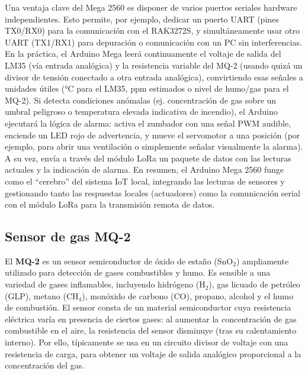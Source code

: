 Una ventaja clave del Mega 2560 es disponer de varios puertos seriales hardware independientes. Esto permite, por ejemplo, dedicar un puerto UART (pines TX0/RX0) para la comunicación con el RAK3272S, y simultáneamente usar otro UART (TX1/RX1) para depuración o comunicación con un PC sin interferencias. En la práctica, el Arduino Mega leerá continuamente el voltaje de salida del LM35 (vía entrada analógica) y la resistencia variable del MQ-2 (usando quizá un divisor de tensión conectado a otra entrada analógica), convirtiendo esas señales a unidades útiles (°C para el LM35, ppm estimados o nivel de humo/gas para el MQ-2). Si detecta condiciones anómalas (ej. concentración de gas sobre un umbral peligroso o temperatura elevada indicativa de incendio), el Arduino ejecutará la lógica de alarma: activa el zumbador con una señal PWM audible, enciende un LED rojo de advertencia, y mueve el servomotor a una posición (por ejemplo, para abrir una ventilación o simplemente señalar visualmente la alarma). A su vez, envía a través del módulo LoRa un paquete de datos con las lecturas actuales y la indicación de alarma. En resumen, el Arduino Mega 2560 funge como el “cerebro” del sistema IoT local, integrando las lecturas de sensores y gestionando tanto las respuestas locales (actuadores) como la comunicación serial con el módulo LoRa para la transmisión remota de datos.

\subsection{Sensor de gas MQ-2}
El \textbf{MQ-2} es un sensor semiconductor de óxido de estaño (SnO$_2$) ampliamente utilizado para detección de gases combustibles y humo. Es sensible a una variedad de gases inflamables, incluyendo hidrógeno (H$_2$), gas licuado de petróleo (GLP), metano (CH$_4$), monóxido de carbono (CO), propano, alcohol y el humo de combustión. El sensor consta de un material semiconductor cuya resistencia eléctrica varía en presencia de ciertos gases: al aumentar la concentración de gas combustible en el aire, la resistencia del sensor disminuye (tras su calentamiento interno). Por ello, típicamente se usa en un circuito divisor de voltaje con una resistencia de carga, para obtener un voltaje de salida analógico proporcional a la concentración del gas.

